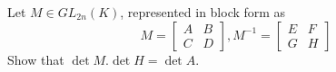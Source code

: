 Let $M \in GL_{2n}(K)$, represented in block form as \[ M = \left[ \begin{array}{cc} A & B \\ C & D \end{array} \right] , M^{-1} = \left[ \begin{array}{cc} E & F \\ G & H \end{array} \right] \]
Show that $\det M.\det H=\det A$.